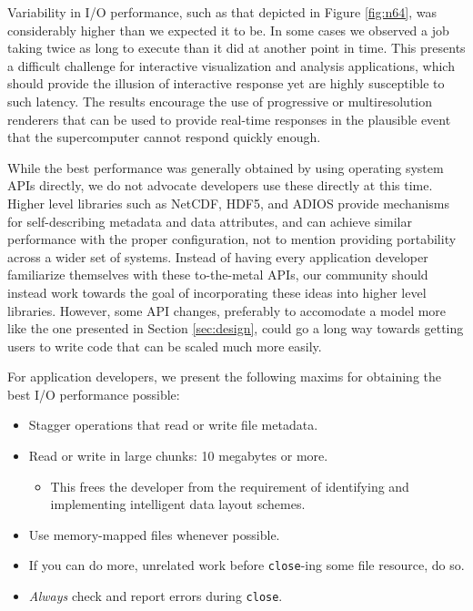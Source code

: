 Variability in I/O performance, such as that depicted in Figure
\ref{fig:n64}, was considerably higher than we expected it to be.  In
some cases we observed a job taking twice as long to execute than it
did at another point in time.  This presents a difficult challenge
for interactive visualization and analysis applications, which should
provide the illusion of interactive response yet are highly susceptible
to such latency.  The results encourage the use of progressive or
multiresolution renderers that can be used to provide real-time
responses in the plausible event that the supercomputer cannot respond
quickly enough.

While the best performance was generally obtained by using operating
system APIs directly, we do not advocate developers use these directly
at this time.  Higher level libraries such as NetCDF, HDF5, and ADIOS
provide mechanisms for self-describing metadata and data attributes,
and can achieve similar performance with the proper configuration,
not to mention providing portability across a wider set of systems.
Instead of having every application developer familiarize themselves
with these to-the-metal APIs, our community should instead work towards
the goal of incorporating these ideas into higher level libraries.
However, some API changes, preferably to accomodate a model more like
the one
presented in Section \ref{sec:design}, could go a long way towards
getting users to write code that can be scaled much more easily.

For application developers, we present the following maxims for
obtaining the best I/O performance possible:

\begin{itemize}
  \item Stagger operations that read or write file metadata.
  \item Read or write in large chunks: 10 megabytes or more.
  \begin{itemize}
    \item This frees the developer from the requirement of
    identifying and implementing intelligent data layout schemes.
  \end{itemize}
  \item Use memory-mapped files whenever possible.
  \item If you can do more, unrelated work before \verb!close!-ing some
  file resource, do so.
  \item \emph{Always} check and report errors during \verb!close!.
\end{itemize}

